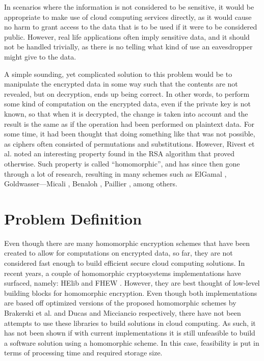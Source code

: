 In scenarios where the information is not considered to be sensitive, it would be appropriate to make use of cloud computing services directly, as it would cause no harm to grant access to the data that is to be used if it were to be considered public. However, real life applications often imply sensitive data, and it should not be handled trivially, as there is no telling what kind of use an eavesdropper might give to the data.

A simple sounding, yet complicated solution to this problem would be to manipulate the encrypted data in some way such that the contents are not revealed, but on decryption, ends up being correct. In other words, to perform some kind of computation on the encrypted data, even if the private key is not known, so that when it is decrypted, the change is taken into account and the result is the same as if the operation had been performed on plaintext data. For some time, it had been thought that doing something like that was not possible, as ciphers often consisted of permutations and substitutions. However, Rivest et al. \cite{rivest1978data} noted an interesting property found in the RSA algorithm that proved otherwise. Such property is called ``homomorphic'', and has since then gone through a lot of research, resulting in many schemes such as ElGamal \cite{ElGamal:1985:PKC:19478.19480}, Goldwasser---Micali \cite{Goldwasser:1982:PEA:800070.802212}, Benaloh \cite{benaloh1994dense}, Paillier \cite{Paillier:1999:PCB:1756123.1756146}, among others.

\section{Problem Definition}

Even though there are many homomorphic encryption schemes that have been created to allow for computations on encrypted data, so far, they are not considered fast enough to build efficient secure cloud computing solutions. In recent years, a couple of homomorphic cryptosystems implementations have surfaced, namely: HElib \cite{helib} and FHEW \cite{fhew}. However, they are best thought of low-level building blocks for homomorphic encryption. Even though both implementations are based off optimized versions of the proposed homomorphic schemes by Brakerski et al. \cite{cryptoeprint:2011:277} and Ducas and Micciancio \cite{fhew} respectively, there have not been attempts to use these libraries to build solutions in cloud computing. As such, it has not been shown if with current implementations it is still unfeasible to build a software solution using a homomorphic scheme. In this case, feasibility is put in terms of processing time and required storage size. 

